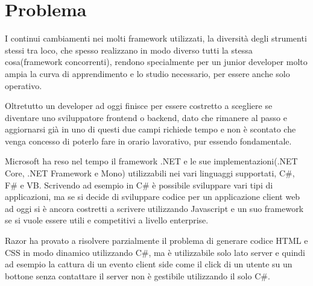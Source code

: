 \section{Problema}\label{sez:problema}
I continui cambiamenti nei molti framework utilizzati, la diversit\`a degli strumenti stessi tra loco, che spesso realizzano in modo diverso tutti la stessa cosa(framework concorrenti), rendono specialmente per un junior developer molto ampia la curva di apprendimento e lo studio necessario, per essere anche solo operativo.

Oltretutto un developer ad oggi finisce per essere costretto a scegliere se diventare uno sviluppatore frontend o backend, dato che rimanere al passo e aggiornarsi gi\`a in uno di questi due campi richiede tempo e non \`e scontato che venga concesso di poterlo fare in orario lavorativo, pur essendo fondamentale.

Microsoft ha reso nel tempo il framework .NET e le sue implementazioni(.NET Core, .NET Framework e Mono) utilizzabili nei vari linguaggi supportati, C\#, F\# e VB.
Scrivendo ad esempio in C\# \`e possibile sviluppare vari tipi di applicazioni, ma se si decide di sviluppare codice per un applicazione client web ad oggi si \`e ancora costretti a scrivere utilizzando Javascript e un suo framework se si vuole essere utili e competitivi a livello enterprise.

Razor ha provato a risolvere parzialmente il problema di generare codice HTML e CSS in modo dinamico utilizzando C\#, ma \`e utilizzabile solo lato server e quindi ad esempio la cattura di un evento client side come il click di un utente su un bottone senza contattare il server non \`e gestibile utilizzando il solo C\#.